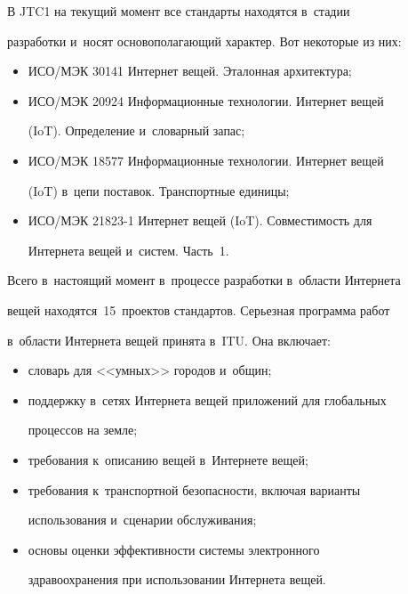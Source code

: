       


      В JTC1 на текущий момент все стандарты находятся в~стадии 


разработки и~носят основополагающий характер. Вот некоторые из них:


      \begin{itemize}


      \item  ИСО/МЭК 30141 Интернет вещей. Эталонная архитектура;


      \item ИСО/МЭК 20924 Информационные технологии. Интернет вещей 


(IoT). Определение и~словарный запас;


      \item ИСО/МЭК 18577 Информационные технологии. Интернет вещей 


(IoT) в~цепи поставок. Транспортные единицы;


      \item ИСО/МЭК 21823-1 Интернет вещей (IoT). Совместимость для 


Интернета вещей и~систем. Часть~1.


      \end{itemize}


      








      


      Всего в~настоящий момент в~процессе разработки в~области Интернета 


вещей находятся~15~проектов стандартов. Серьезная программа работ 


в~области Интернета вещей принята в~ITU. Она включает:


      \begin{itemize}


      \item словарь для <<умных>> городов и~общин;


      \item поддержку в~сетях Интернета вещей приложений для глобальных 


процессов на земле;


      \item требования к~описанию вещей в~Интернете вещей;


      \item требования к~транспортной безопасности, включая варианты 


использования и~сценарии обслуживания;


      \item основы оценки эффективности системы электронного 


здравоохранения при использовании Интернета вещей.


      \end{itemize}


